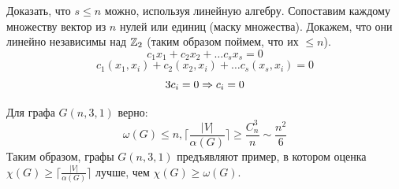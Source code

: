 \begin{note}
    \label{linalg_method}
    Доказать, что \(s \le n\) можно, используя линейную алгебру. Сопоставим каждому множеству вектор из \(n\) нулей или единиц (маску множества). Докажем, что они линейно независимы над \(\mathbb{Z}_2\) (таким образом поймем, что их \(\le n\)).
    \[c_1x_1 + c_2x_2 + \dots c_sx_s = 0\]
    \[c_1(x_1, x_i) + c_2(x_2, x_i) + \dots c_s(x_s, x_i) = 0\]
    \[3c_i = 0 \Rightarrow c_i = 0\]
\end{note}

\begin{corollary}
    Для графа \(G(n, 3, 1)\) верно: 
    \[\omega(G) \le n, \lceil\frac{|V|}{\alpha(G)}\rceil \ge \frac{C_n^3}{n} \sim \frac{n^2}{6}\]
    Таким образом, графы \(G(n, 3, 1)\) предъявляют пример, в котором оценка \(\chi(G) \ge \lceil\frac{|V|}{\alpha(G)}\rceil\) лучше, чем \(\chi(G) \ge \omega(G)\).
\end{corollary}
